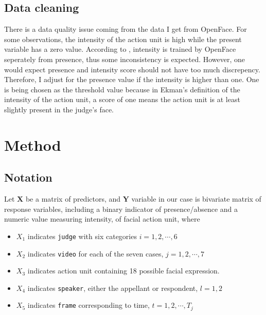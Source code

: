 \documentclass{monashthesis}
\begin{document}
\hypertarget{data-cleaning}{%
\section{Data cleaning}\label{data-cleaning}}

There is a data quality issue coming from the data I get from OpenFace. For some observations, the intensity of the action unit is high while the present variable has a zero value. According to \textcite{baltrusaitis2018openface}, intensity is trained by OpenFace seperately from presence, thus some inconsistency is expected. However, one would expect presence and intensity score should not have too much discrepency. Therefore, I adjust for the presence value if the intensity is higher than one. One is being chosen as the threshold value because in Ekman's definition of the intensity of the action unit, a score of one means the action unit is at least slightly present in the judge's face.

\hypertarget{method}{%
\chapter{Method}\label{method}}

\hypertarget{notation}{%
\section{Notation}\label{notation}}

Let \(\mathbf{X}\) be a matrix of predictors, and \(\mathbf{Y}\) variable in our case is bivariate matrix of response variables, including a binary indicator of presence/absence and a numeric value measuring intensity, of facial action unit, where

\begin{itemize}
\tightlist
\item
  \(X_1\) indicates \texttt{judge} with six categories \(i = 1,2, \cdots, 6\)
\item
  \(X_2\) indicates \texttt{video} for each of the seven cases, \(j = 1,2, \cdots, 7\)
\item
  \(X_3\) indicates action unit containing 18 possible facial expression.\\
\item
  \(X_4\) indicates \texttt{speaker}, either the appellant or respondent, \(l=1,2\)
\item
  \(X_5\) indicates \texttt{frame} corresponding to time, \(t = 1,2, \cdots, T_j\)
\end{itemize}
\end{document}
